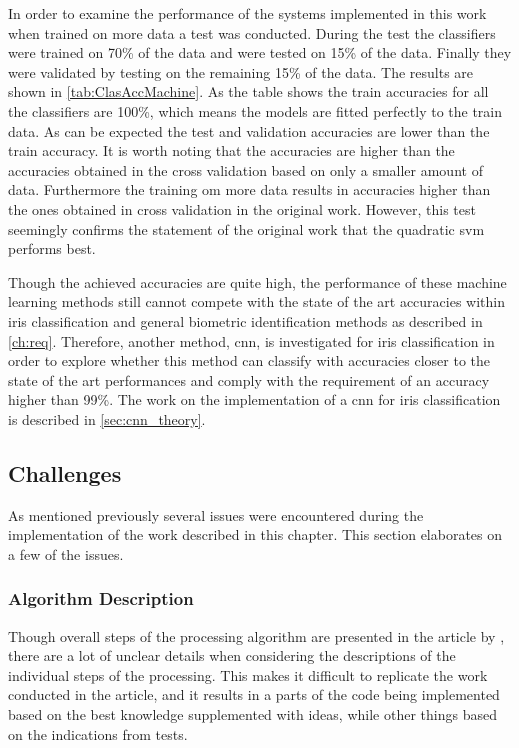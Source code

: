In order to examine the performance of the systems implemented in this work when trained on more data a test was conducted. During the test the classifiers were trained on 70\% of the data and were tested on 15\% of the data. Finally they were validated by testing on the remaining 15\% of the data. The results are shown in \autoref{tab:ClasAccMachine}. As the table shows the train accuracies for all the classifiers are 100\%, which means the models are fitted perfectly to the train data. As can be expected the test and validation accuracies are lower than the train accuracy. It is worth noting that the accuracies are higher than the accuracies obtained in the cross validation based on only a smaller amount of data. Furthermore the training om more data results in accuracies higher than the ones obtained in cross validation in the original work. However, this test seemingly confirms the statement of the original work that the quadratic \gls{svm} performs best.

Though the achieved accuracies are quite high, the performance of these machine learning methods still cannot compete with the state of the art accuracies within iris classification and general biometric identification methods as described in \autoref{ch:req}. Therefore, another method, \gls{cnn}, is investigated for iris classification in order to explore whether this method can classify with accuracies closer to the state of the art performances and comply with the requirement of an accuracy higher than 99\%. The work on the implementation of a \gls{cnn} for iris classification is described in \autoref{sec:cnn_theory}. 

\subsection{Challenges}
\label{sec:ChallDatabase}
As mentioned previously several issues were encountered during the implementation of the work described in this chapter. This section elaborates on a few of the issues. 

\subsubsection{Algorithm Description} 
Though overall steps of the processing algorithm are presented in the article by \cite{Khan2017a}, there are a lot of unclear details when considering the descriptions of the individual steps of the processing. This makes it difficult to replicate the work conducted in the article, and it results in a parts of the code being implemented based on the best knowledge supplemented with ideas, while other things based on the indications from tests.

